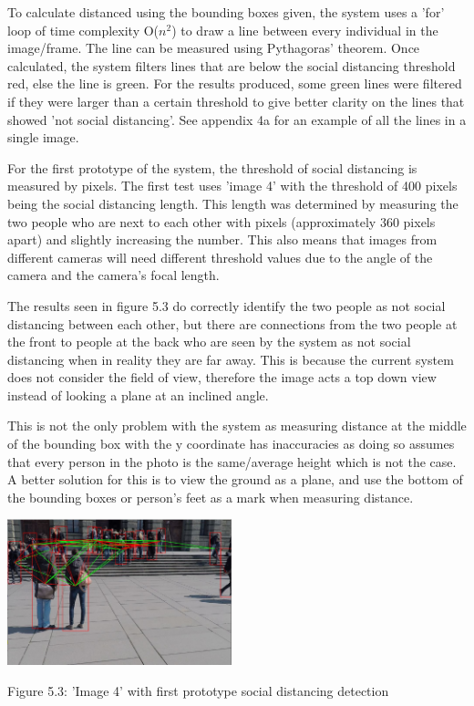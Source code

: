 \documentclass[12pt]{report}
\begin{document}
To calculate distanced using the bounding boxes given, the system uses a 'for' loop of time complexity O($n^2$) to draw a line between every individual in the image/frame. The line can be measured using Pythagoras' theorem. Once calculated, the system filters lines that are below the social distancing threshold red, else the line is green. For the results produced, some green lines were filtered if they were larger than a certain threshold to give better clarity on the lines that showed 'not social distancing'. See appendix 4a for an example of all the lines in a single image.

\vspace{2mm}

For the first prototype of the system, the threshold of social distancing is measured by pixels. The first test uses 'image 4' with the threshold of 400 pixels being the social distancing length. This length was determined by measuring the two people who are next to each other with pixels (approximately 360 pixels apart) and slightly increasing the number. This also means that images from different cameras will need different threshold values due to the angle of the camera and the camera's focal length.

\vspace{2mm}

The results seen in figure 5.3 do correctly identify the two people as not social distancing between each other, but there are connections from the two people at the front to people at the back who are seen by the system as not social distancing when in reality they are far away. This is because the current system does not consider the field of view, therefore the image acts a top down view instead of looking a plane at an inclined angle.

\vspace{2mm}

This is not the only problem with the system as measuring distance at the middle of the bounding box with the y coordinate has inaccuracies as doing so assumes that every person in the photo is the same/average height which is not the case. A better solution for this is to view the ground as a plane, and use the bottom of the bounding boxes or person's feet as a mark when measuring distance. 

\begin{center}
	\includegraphics[width=65mm]{./images/appendix/test1.JPG}
	
	{\footnotesize Figure 5.3: 'Image 4' with first prototype social distancing detection}
\end{center}
\end{document}
